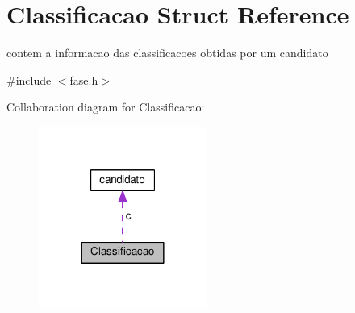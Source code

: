\hypertarget{structClassificacao}{}\section{Classificacao Struct Reference}
\label{structClassificacao}


contem a informacao das classificacoes obtidas por um candidato  




{\ttfamily \#include $<$fase.\+h$>$}



Collaboration diagram for Classificacao\+:\nopagebreak
\begin{figure}[H]
\begin{center}
\leavevmode
\includegraphics[width=156pt]{structClassificacao__coll__graph}
\end{center}
\end{figure}
